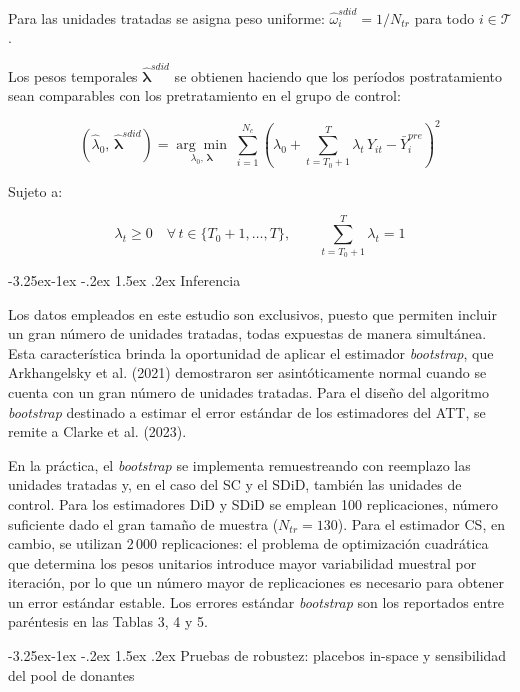\documentclass[12pt,a4paper]{article}
\makeatletter
\renewcommand\subsection{\@startsection{subsection}{2}{\z@}%
  {-3.25ex\@plus -1ex \@minus -.2ex}%
  {1.5ex \@plus .2ex}%
  {\normalfont\normalsize}}
\makeatother
\begin{document}
Para las unidades tratadas se asigna peso uniforme: $\hat{\omega}_i^{sdid} = 1/N_{tr}$ para todo $i \in \mathcal{T}$.

Los pesos temporales $\hat{\boldsymbol{\lambda}}^{sdid}$ se obtienen haciendo que los períodos postratamiento sean comparables con los pretratamiento en el grupo de control:

\[
(\hat{\lambda}_0,\,\hat{\boldsymbol{\lambda}}^{sdid}) = \underset{\lambda_0,\,\boldsymbol{\lambda}}{\arg\min}\;\sum_{i=1}^{N_c}\!\left(\lambda_0 + \sum_{t=T_0+1}^{T}\lambda_t\,Y_{it} - \bar{Y}_i^{pre}\right)^{\!2}
\]

\noindent Sujeto a:

\[
\lambda_t \geq 0 \quad \forall\, t \in \{T_0+1,\ldots,T\}, \qquad \sum_{t=T_0+1}^{T}\lambda_t = 1
\]


\subsection{Inferencia}

Los datos empleados en este estudio son exclusivos, puesto que permiten incluir un gran número de unidades tratadas, todas expuestas de manera simultánea. Esta característica brinda la oportunidad de aplicar el estimador \textit{bootstrap}, que Arkhangelsky et al. (2021) demostraron ser asintóticamente normal cuando se cuenta con un gran número de unidades tratadas. Para el diseño del algoritmo \textit{bootstrap} destinado a estimar el error estándar de los estimadores del ATT, se remite a Clarke et al. (2023).

En la práctica, el \textit{bootstrap} se implementa remuestreando con reemplazo las unidades tratadas y, en el caso del SC y el SDiD, también las unidades de control. Para los estimadores DiD y SDiD se emplean 100 replicaciones, número suficiente dado el gran tamaño de muestra ($N_{tr} = 130$). Para el estimador CS, en cambio, se utilizan 2\,000 replicaciones: el problema de optimización cuadrática que determina los pesos unitarios introduce mayor variabilidad muestral por iteración, por lo que un número mayor de replicaciones es necesario para obtener un error estándar estable. Los errores estándar \textit{bootstrap} son los reportados entre paréntesis en las Tablas 3, 4 y 5.


\subsection{Pruebas de robustez: placebos in-space y sensibilidad del pool de donantes}
\end{document}
